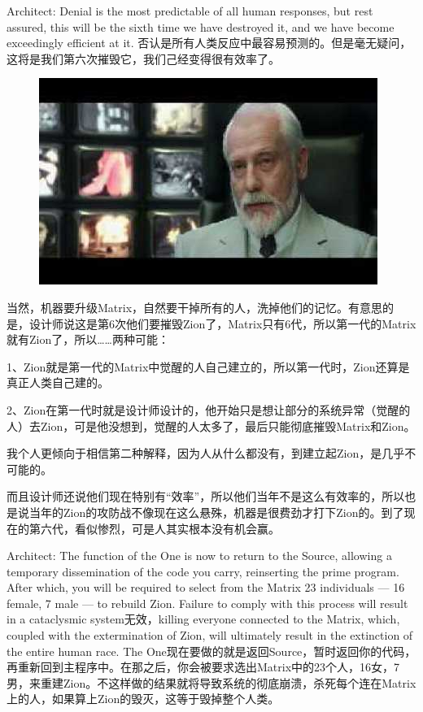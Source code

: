 \documentclass{ctexart}
\begin{document}
Architect: Denial is the most predictable of all human responses, but rest assured, this will be the sixth time we have destroyed it, and we have become exceedingly efficient at it. 否认是所有人类反应中最容易预测的。但是毫无疑问，这将是我们第六次摧毁它，我们己经变得很有效率了。

\begin{figure}[htb]
\centering
\includegraphics[width=0.5\linewidth]{fig/read_reloaded-164}
\end{figure}

当然，机器要升级Matrix，自然要干掉所有的人，洗掉他们的记忆。有意思的是，设计师说这是第6次他们要摧毁Zion了，Matrix只有6代，所以第一代的Matrix就有Zion了，所以……两种可能：

1、Zion就是第一代的Matrix中觉醒的人自己建立的，所以第一代时，Zion还算是真正人类自己建的。

2、Zion在第一代时就是设计师设计的，他开始只是想让部分的系统异常（觉醒的人）去Zion，可是他没想到，觉醒的人太多了，最后只能彻底摧毁Matrix和Zion。

我个人更倾向于相信第二种解释，因为人从什么都没有，到建立起Zion，是几乎不可能的。

而且设计师还说他们现在特别有“效率”，所以他们当年不是这么有效率的，所以也是说当年的Zion的攻防战不像现在这么悬殊，机器是很费劲才打下Zion的。到了现在的第六代，看似惨烈，可是人其实根本没有机会赢。

Architect: The function of the One is now to return to the Source, allowing a temporary dissemination of the code you carry, reinserting the prime program. After which, you will be required to select from the Matrix 23 individuals --- 16 female, 7 male --- to rebuild Zion. Failure to comply with this process will result in a cataclysmic system无效，killing everyone connected to the Matrix, which, coupled with the extermination of Zion, will ultimately result in the extinction of the entire human race. The One现在要做的就是返回Source，暂时返回你的代码，再重新回到主程序中。在那之后，你会被要求选出Matrix中的23个人，16女，7男，来重建Zion。不这样做的结果就将导致系统的彻底崩溃，杀死每个连在Matrix上的人，如果算上Zion的毁灭，这等于毁掉整个人类。
\end{document}
